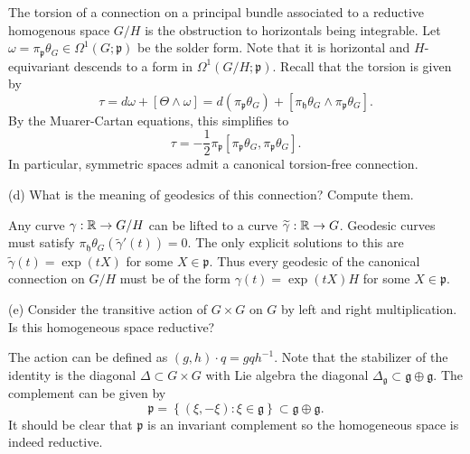 \documentclass{../../templates/lkx_pset}
\begin{document}
\begin{parts}
	The torsion of a connection on a principal bundle associated to a reductive homogenous space $G/H$ is the obstruction to horizontals being integrable.
	Let $\omega = \pi_\mathfrak{p} \theta_G\in \Omega^1(G;\mathfrak{p})$ be the solder form. Note that it is horizontal and $H$-equivariant descends to a form in $\Omega^1(G/H;\mathfrak{p})$. Recall that the torsion is given by
	\[
		\tau = d\omega +[\Theta\wedge \omega] = d(\pi_{\mathfrak{p}}\theta_G) + [\pi_{\mathfrak{h}}\theta_G \wedge \pi_{\mathfrak{p}}\theta_G].
	\]
	By the Muarer-Cartan equations, this simplifies to
	\[
		\tau = -\frac{1}{2}\pi_{\mathfrak{p}}[\pi_\mathfrak{p}\theta_G, \pi_{\mathfrak{p}} \theta_G].
	\]
	In particular, symmetric spaces admit a canonical torsion-free connection.

	\begin{part}{(d)}
		What is the meaning of geodesics of this connection? Compute them.
	\end{part}

	Any curve $\gamma : \mathbb{R} \to G/H$ can be lifted to a curve $\widetilde{\gamma} : \mathbb{R} \to G$. Geodesic curves must satisfy $\pi_{\mathfrak{h}}\theta_G(\widetilde{\gamma}'(t))=0$. The only explicit solutions to this are $\widetilde{\gamma}(t)=\exp(tX)$ for some $X\in \mathfrak{p}$. Thus every geodesic of the canonical connection on $G/H$ must be of the form $\gamma(t) = \exp(tX)H$ for some $X\in \mathfrak{p}$.


	\begin{part}{(e)}
		Consider the transitive action of $G\times G$ on $G$ by left and right multiplication. Is this homogeneous space reductive?
	\end{part}

	The action can be defined as $(g,h)\cdot q = gqh^{-1}$. Note that the stabilizer of the identity is the diagonal $\Delta\subset G\times G$ with Lie algebra the diagonal $\Delta_\mathfrak{g}\subset \mathfrak{g}\oplus\mathfrak{g}$. The complement can be given by
	\[
		\mathfrak{p}=\left\{ (\xi, -\xi) : \xi \in \mathfrak{g}\right\}\subset\mathfrak{g}\oplus\mathfrak{g}.
	\]
	It should be clear that $\mathfrak{p}$ is an invariant complement so the homogeneous space is indeed reductive.
\end{parts}
%
\end{document}
